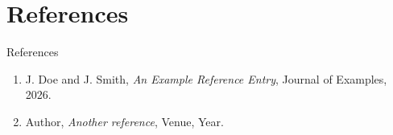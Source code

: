 \section{References}

\begin{frame}{References}
\footnotesize
\begin{enumerate}
  \item J. Doe and J. Smith, \emph{An Example Reference Entry}, Journal of
        Examples, 2026.
  \item Author, \emph{Another reference}, Venue, Year.
\end{enumerate}
\end{frame}
